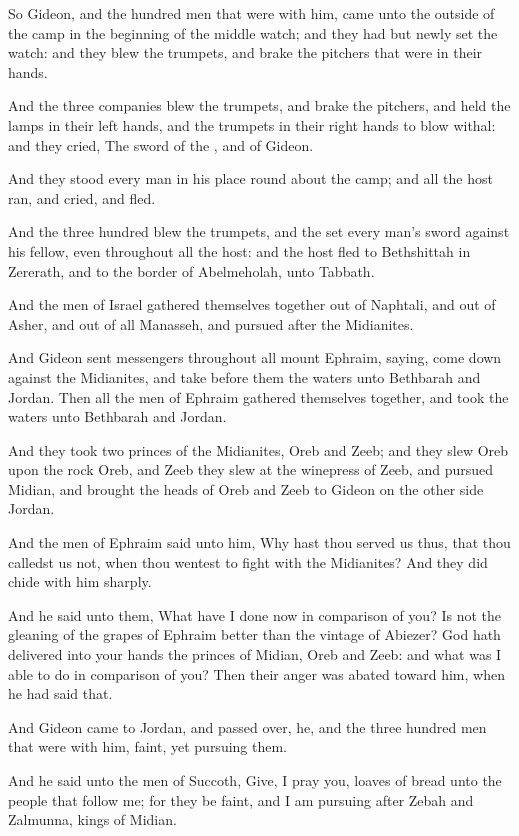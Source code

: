 \Verse So Gideon, and the hundred men that were with him, came unto the outside of the camp in the beginning of the middle watch; and they had but newly set the watch: and they blew the trumpets, and brake the pitchers that were in their hands.

\Verse And the three companies blew the trumpets, and brake the pitchers, and held the lamps in their left hands, and the trumpets in their right hands to blow withal: and they cried, The sword of the \LORD, and of Gideon.

\Verse And they stood every man in his place round about the camp; and all the host ran, and cried, and fled.

\Verse And the three hundred blew the trumpets, and the \LORD set every man's sword against his fellow, even throughout all the host: and the host fled to Bethshittah in Zererath, and to the border of Abelmeholah, unto Tabbath.

\Verse And the men of Israel gathered themselves together out of Naphtali, and out of Asher, and out of all Manasseh, and pursued after the Midianites.

\Verse And Gideon sent messengers throughout all mount Ephraim, saying, come down against the Midianites, and take before them the waters unto Bethbarah and Jordan. Then all the men of Ephraim gathered themselves together, and took the waters unto Bethbarah and Jordan.

\Verse And they took two princes of the Midianites, Oreb and Zeeb; and they slew Oreb upon the rock Oreb, and Zeeb they slew at the winepress of Zeeb, and pursued Midian, and brought the heads of Oreb and Zeeb to Gideon on the other side Jordan.


\Chapter
\Verse And the men of Ephraim said unto him, Why hast thou served us thus, that thou calledst us not, when thou wentest to fight with the Midianites?  And they did chide with him sharply.

\Verse And he said unto them, What have I done now in comparison of you?  Is not the gleaning of the grapes of Ephraim better than the vintage of Abiezer?  \Verse God hath delivered into your hands the princes of Midian, Oreb and Zeeb: and what was I able to do in comparison of you?  Then their anger was abated toward him, when he had said that.

\Verse And Gideon came to Jordan, and passed over, he, and the three hundred men that were with him, faint, yet pursuing them.

\Verse And he said unto the men of Succoth, Give, I pray you, loaves of bread unto the people that follow me; for they be faint, and I am pursuing after Zebah and Zalmunna, kings of Midian.

